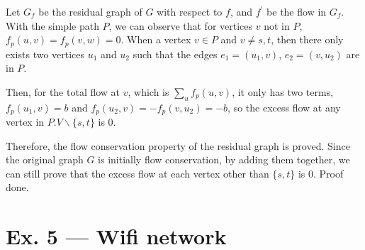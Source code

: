 \documentclass[12pt, a4paper]{article}
\begin{document}
Let $G_f$ be the residual graph of $G$ with respect to $f$, and $f^\prime$ be the flow in $G_f$. 
With the simple path $P$, we can observe that for vertices $v$ not in $P$, $f_p(u, v) = f_p(v, w) = 0$. 
When a vertex $v\in P$ and $v\neq s, t$, then there only exists two vertices $u_1$ and $u_2$ such that the edges $e_1 = (u_1, v)$, 
$e_2 = (v, u_2)$ are in $P$. 

Then, for the total flow at $v$, which is $\sum_u f_p(u, v)$, it only has two terms, 
$f_p(u_1, v) = b$ and $f_p(u_2, v) = -f_p(v, u_2) = -b$, so the excess flow at any vertex in $P.V\backslash \{s, t\}$ is 0.

Therefore, the flow conservation property of the residual graph is proved. Since the original graph $G$ is initially flow conservation, 
by adding them together, we can still prove that the excess flow at each vertex other than $\{s,t\}$ is 0. Proof done.

\section*{Ex. 5 --- Wifi network}
\end{document}
